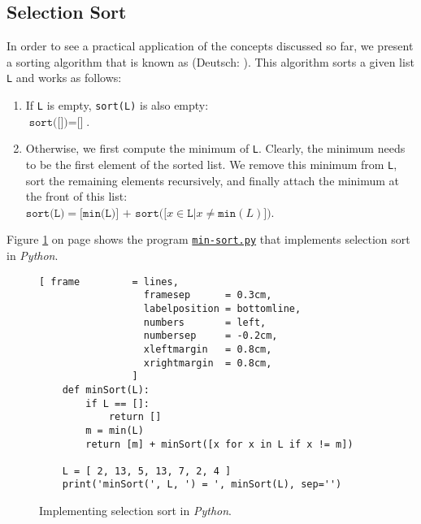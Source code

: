 \subsection{Selection Sort}
In order to see a practical application of the concepts discussed so far, we present a sorting
algorithm that is known as \href{https://en.wikipedia.org/wiki/Selection_sort}{}
(Deutsch: ).  
This algorithm sorts a given list \texttt{L} and works as follows:
\begin{enumerate}
\item If \texttt{L} is empty, \texttt{sort(L)} is also empty:
      \\[0.2cm]
      \hspace*{1.3cm}
      $\texttt{sort([])} = \texttt{[]}$.
\item Otherwise, we first compute the minimum of \texttt{L}.  Clearly, the minimum needs to be the
      first element of the sorted list.  We remove this minimum from \texttt{L}, sort the remaining
      elements recursively, and finally attach the minimum at the front of this list:
      \\[0.2cm]
      \hspace*{1.3cm}
      $\texttt{sort(L)} = \texttt{[min(L)] + sort([}x \in \texttt{L} \texttt{|} x \not= \texttt{min}(L)\texttt{])}$.
\end{enumerate}
Figure \ref{fig:min-sort.py} on page \pageref{fig:min-sort.py} shows the program
\href{https://github.com/karlstroetmann/Logic/blob/master/Python/min-sort.py}{\texttt{min-sort.py}}
that implements selection sort  in \textsl{Python}. 

\begin{figure}[!ht]
\centering
\begin{Verbatim}[ frame         = lines, 
                  framesep      = 0.3cm, 
                  labelposition = bottomline,
                  numbers       = left,
                  numbersep     = -0.2cm,
                  xleftmargin   = 0.8cm,
                  xrightmargin  = 0.8cm,
                ]
    def minSort(L):
        if L == []:
            return []
        m = min(L)
        return [m] + minSort([x for x in L if x != m])
    
    L = [ 2, 13, 5, 13, 7, 2, 4 ]
    print('minSort(', L, ') = ', minSort(L), sep='')
\end{Verbatim}
\vspace*{-0.3cm}
\caption{Implementing selection sort in \textsl{Python}.}
\label{fig:min-sort.py}
\end{figure}


